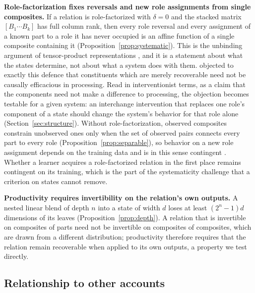 \documentclass[10pt]{article}
\theoremstyle{plain}
\theoremstyle{remark}
\begin{document}
\textbf{Role-factorization fixes reversals and new role assignments from single composites.} If a relation is role-factorized with $\delta = 0$ and the stacked matrix $[B_1 \cdots B_k]$ has full column rank, then every role reversal and every assignment of a known part to a role it has never occupied is an affine function of a single composite containing it (Proposition~\ref{prop:systematic}). This is the unbinding argument of tensor-product representations \citep{smolensky1990}, and it is a statement about what the states determine, not about what a system does with them. \citet{fodor1990} objected to exactly this defence that constituents which are merely recoverable need not be causally efficacious in processing. Read in interventionist terms, as a claim that the components need not make a difference to processing, the objection becomes testable for a given system: an interchange intervention that replaces one role's component of a state should change the system's behavior for that role alone (Section~\ref{sec:structure}). Without role-factorization, observed composites constrain unobserved ones only when the set of observed pairs connects every part to every role (Proposition~\ref{prop:separable}), so behavior on a new role assignment depends on the training data and is in this sense contingent \citep{aizawa2003}. Whether a learner acquires a role-factorized relation in the first place remains contingent on its training, which is the part of the systematicity challenge that a criterion on states cannot remove.

\textbf{Productivity requires invertibility on the relation's own outputs.} A nested linear blend of depth $n$ into a state of width $d$ loses at least $(2^n - 1)d$ dimensions of its leaves (Proposition~\ref{prop:depth}). A relation that is invertible on composites of parts need not be invertible on composites of composites, which are drawn from a different distribution; productivity therefore requires that the relation remain recoverable when applied to its own outputs, a property we test directly.

\subsection{Relationship to other accounts}
\label{sec:related}
\end{document}
